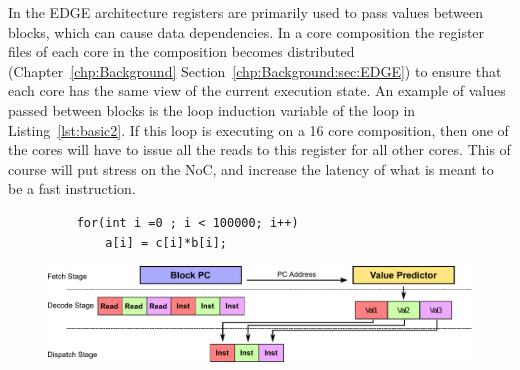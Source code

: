 In the EDGE architecture registers are primarily used to pass values between blocks, which can cause data dependencies.
In a core composition the register files of each core in the composition becomes distributed (Chapter~\ref{chp:Background} Section~\ref{chp:Background:sec:EDGE}) to ensure that each core has the same view of the current execution state.
An example of values passed between blocks is the loop induction variable of the loop in Listing~\ref{lst:basic2}.%
If this loop is executing on a 16 core composition, then one of the cores will have to issue all the reads to this register for all other cores.
This of course will put stress on the NoC, and increase the latency of what is meant to be a fast instruction.


\begin{figure}[t]
\lstset{language=C,numbersep=4pt}
\centering
\begin{lstlisting}
	for(int i =0 ; i < 100000; i++)
		a[i] = c[i]*b[i];
\end{lstlisting}
\label{lst:basic2}
\vspace{2em}
    \centering
    \includegraphics[width=1\textwidth]{chapter3/graphics/val_pred_overview.pdf}
    \label{fig:bad_overview}
\vspace{1em}
\end{figure}

